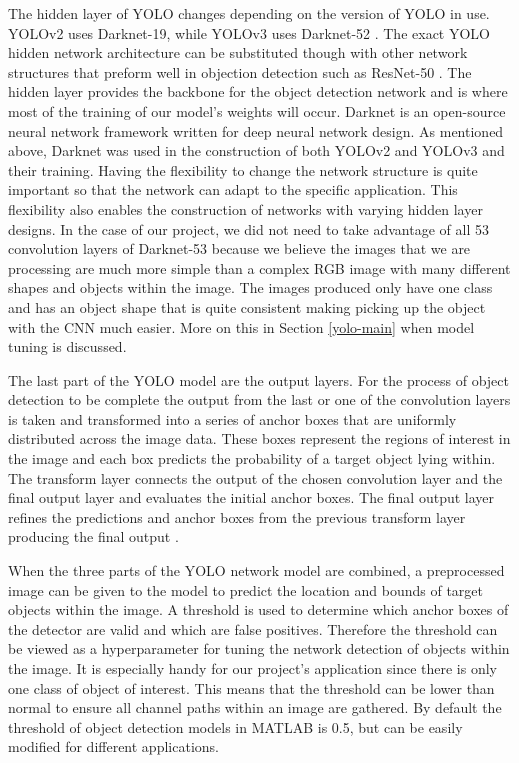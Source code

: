 The hidden layer of YOLO changes depending on the version of YOLO in use. YOLOv2 uses Darknet-19, while YOLOv3 uses Darknet-52 \cite{Redmon2018}. The exact YOLO hidden network architecture can be substituted though with other network structures that preform well in objection detection such as ResNet-50 \cite{Matlab2021a}. The hidden layer provides the backbone for the object detection network and is where most of the training of our model's weights will occur. Darknet is an open-source neural network framework written for deep neural network design. As mentioned above, Darknet was used in the construction of both YOLOv2 and YOLOv3 and their training. Having the flexibility to change the network structure is quite important so that the network can adapt to the specific application. This flexibility also enables the construction of networks with varying hidden layer designs. In the case of our project, we did not need to take advantage of all 53 convolution layers of Darknet-53 because we believe the images that we are processing are much more simple than a complex RGB image with many different shapes and objects within the image. The images produced only have one class and has an object shape that is quite consistent making picking up the object with the CNN much easier. More on this in Section \ref{yolo-main} when model tuning is discussed.

The last part of the YOLO model are the output layers. For the process of object detection to be complete the output from the last or one of the convolution layers is taken and transformed into a series of anchor boxes that are uniformly distributed across the image data. These boxes represent the regions of interest in the image and each box predicts the probability of a target object lying within. The transform layer connects the output of the chosen convolution layer and the final output layer and evaluates the initial anchor boxes. The final output layer refines the predictions and anchor boxes from the previous transform layer producing the final output \cite{Matlab2021a}. 

When the three parts of the YOLO network model are combined, a preprocessed image can be given to the model to predict the location and bounds of target objects within the image. A threshold is used to determine which anchor boxes of the detector are valid and which are false positives. Therefore the threshold can be viewed as a hyperparameter for tuning the network detection of objects within the image. It is especially handy for our project's application since there is only one class of object of interest. This means that the threshold can be lower than normal to ensure all channel paths within an image are gathered. By default the threshold of object detection models in MATLAB is 0.5, but can be easily modified for different applications.

